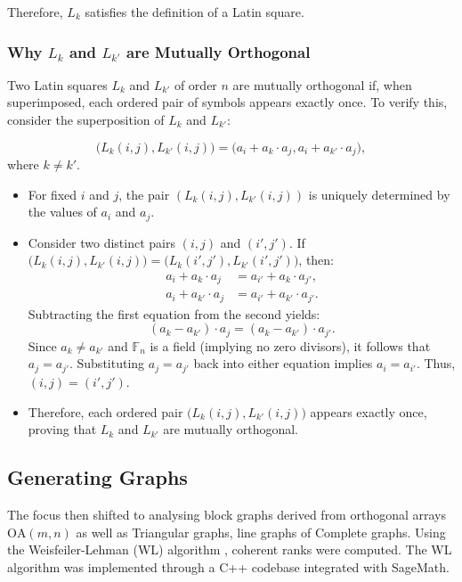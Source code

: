 \documentclass[12pt]{article}
\begin{document}
Therefore, \( L_k \) satisfies the definition of a Latin square.

\subsubsection{Why \( L_k \) and \( L_{k'} \) are Mutually Orthogonal} 

Two Latin squares \( L_k \) and \( L_{k'} \) of order \( n \) are mutually orthogonal if, when superimposed, each ordered pair of symbols appears exactly once. To verify this, consider the superposition of \( L_k \) and \( L_{k'} \):

\[
\big(L_k(i, j), L_{k'}(i, j)\big) = \big(a_i + a_k \cdot a_j, a_i + a_{k'} \cdot a_j\big),
\]
where \( k \neq k' \).

\begin{itemize}
    \item For fixed \( i \) and \( j \), the pair \( (L_k(i, j), L_{k'}(i, j)) \) is uniquely determined by the values of \( a_i \) and \( a_j \).
    \item Consider two distinct pairs \( (i, j) \) and \( (i', j') \). If \( \big(L_k(i, j), L_{k'}(i, j)\big) = \big(L_k(i', j'), L_{k'}(i', j')\big) \), then:
    \[
    \begin{aligned}
    a_i + a_k \cdot a_j &= a_{i'} + a_k \cdot a_{j'}, \\
    a_i + a_{k'} \cdot a_j &= a_{i'} + a_{k'} \cdot a_{j'}.
    \end{aligned}
    \]
    Subtracting the first equation from the second yields:
    \[
    (a_k - a_{k'}) \cdot a_j = (a_k - a_{k'}) \cdot a_{j'}.
    \]
    Since \( a_k \neq a_{k'} \) and \( \mathbb{F}_n \) is a field (implying no zero divisors), it follows that \( a_j = a_{j'} \). Substituting \( a_j = a_{j'} \) back into either equation implies \( a_i = a_{i'} \). Thus, \( (i, j) = (i', j') \).

    \item Therefore, each ordered pair \( \big(L_k(i, j), L_{k'}(i, j)\big) \) appears exactly once, proving that \( L_k \) and \( L_{k'} \) are mutually orthogonal.
\end{itemize}



\subsection{Generating Graphs}
The focus then shifted to analysing block graphs derived from orthogonal arrays \(\text{OA}(m, n)\) as well as Triangular graphs, line graphs of Complete graphs. Using the Weisfeiler-Lehman (WL) algorithm \cite{k-wl}, coherent ranks were computed. The WL algorithm was implemented through a C++ codebase \cite{reichard_weisfeiler} integrated with SageMath.
\end{document}
